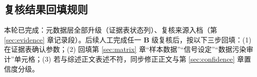 \subsection{复核结果回填规则}

\noindent 本轮已完成：元数据层全部升级（证据表状态列）、复核来源入档（第 \ref{sec:evidence} 章记录段）。后续人工完成任一 \textbf{B} 级复核后，按以下三步回填：(1) 在证据表确认参数；(2) 回填第 \ref{sec:matrix} 章“样本数据”“信号设定”“数据污染审计”单元格；(3) 若与综述正文表述不符，同步修正正文与第 \ref{sec:confidence} 章置信度分级。
